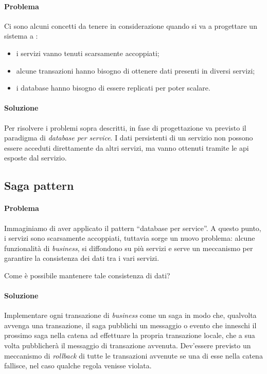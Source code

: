 \paragraph*{Problema} Ci sono alcuni concetti da tenere in considerazione quando si va a progettare un sistema a :
\begin{itemize}[noitemsep]
	\item i servizi vanno tenuti scarsamente accoppiati;
	\item alcune transazioni hanno bisogno di ottenere dati presenti in diversi servizi;
	\item i database hanno bisogno di essere replicati per poter scalare.
\end{itemize}

\paragraph*{Soluzione} Per risolvere i problemi sopra descritti, in fase di progettazione va previsto il paradigma di \textit{database per service}.
I dati persistenti di un servizio non possono essere acceduti direttamente da altri servizi, ma vanno ottenuti tramite le \gls{api} esposte dal servizio.


\subsection{Saga pattern}

\paragraph*{Problema} Immaginiamo di aver applicato il pattern ``database per service''.
A questo punto, i servizi sono scarsamente accoppiati, tuttavia sorge un nuovo problema: alcune funzionalità di \textit{business}, si diffondono su più servizi e serve un meccanismo per garantire la consistenza dei dati
tra i vari servizi. 

Come è possibile mantenere tale consistenza di dati?

\paragraph*{Soluzione} Implementare ogni transazione di \textit{business} come un saga in modo che, qualvolta avvenga una transazione, il saga pubblichi un messaggio o evento che inneschi il prossimo saga nella catena ad effettuare la propria transazione locale, che a sua volta pubblicherà il messaggio di transazione avvenuta.
Dev'essere previsto un meccanismo di \textit{rollback} di tutte le transazioni avvenute se una di esse nella catena fallisce, nel caso qualche regola venisse violata.


